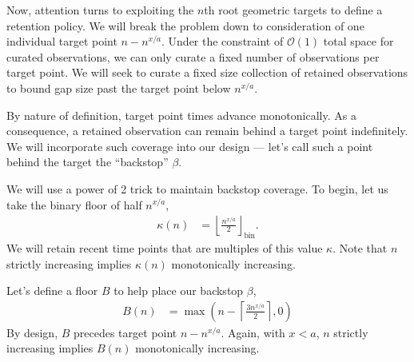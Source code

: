 
Now, attention turns to exploiting the $n$th root geometric targets to define a retention policy.
We will break the problem down to consideration of one individual target point $n - n^{x/a}$.
Under the constraint of $\mathcal{O}(1)$ total space for curated observations, we can only curate a fixed number of observations per target point.
We will seek to curate a fixed size collection of retained observations to bound gap size past the target point below $n^{x/a}$.

By nature of definition, target point times advance monotonically.
As a consequence, a retained observation can remain behind a target point indefinitely.
We will incorporate such coverage into our design --- let's call such a point behind the target the ``backstop'' $\beta$.

We will use a power of 2 trick to maintain backstop coverage.
To begin, let us take the binary floor of half $n^{x/a}$,
\begin{align*}
  \kappa(n)
  &=
  \left\lfloor \frac{n^{x/a}}{2} \right\rfloor_{\mathrm{bin}}.
\end{align*}
We will retain recent time points that are multiples of this value $\kappa$.
Note that $n$ strictly increasing implies $\kappa(n)$ monotonically increasing.

Let's define a floor $B$ to help place our backstop $\beta$,
\begin{align*}
  B(n)
  &=
  \max \left(
    n - \left\lceil  \frac{3n^{x/a}}{2} \right\rceil,
    0
  \right)
\end{align*}
By design, $B$ precedes target point $n - n^{x/a}$.
Again, with $x < a$, $n$ strictly increasing implies $B(n)$ monotonically increasing.

